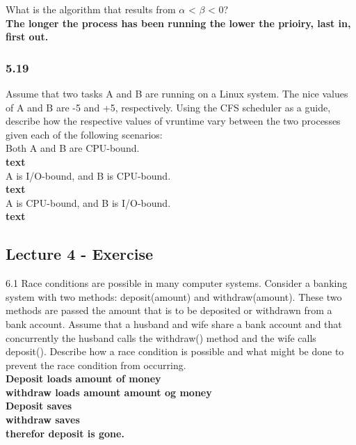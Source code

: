 \documentclass[a4paper,10pt,titlepage]{report}
\begin{document}
\hspace{10mm}What is the algorithm that results from $\alpha$ < $\beta$ < 0?\\

\setlength\parindent{20mm} \textbf{
	The longer the process has been running the lower the prioiry, last in, first out.
} \\

\subsubsection{5.19}
Assume that two tasks A and B are running on a Linux system. The nice values of A and B are -5 and +5, respectively. Using the CFS scheduler as a guide, describe how the respective values of vruntime vary between the two processes given each of the following scenarios:\\
\hspace{10mm} Both A and B are CPU-bound.\\
\hspace{20mm} \textbf{
	text
} \\

\hspace{10mm} A is I/O-bound, and B is CPU-bound.\\
\hspace{20mm} \textbf{
	text
} \\

\hspace{10mm} A is CPU-bound, and B is I/O-bound.\\
\hspace{20mm} \textbf{
	text
} \\
\subsection{Lecture 4 - Exercise}
6.1 Race conditions are possible in many computer systems. Consider a banking system with two methods: deposit(amount) and withdraw(amount). These two methods are passed the amount that is to be deposited or withdrawn from a bank account. Assume that a husband and wife share a bank account and that concurrently the husband calls the withdraw() method and the wife calls deposit(). Describe how a race condition is possible and what might be done to prevent the race condition from occurring.\\

\textbf{
Deposit loads  amount of money\\
withdraw loads amount amount og money\\
Deposit saves\\
withdraw saves\\
therefor deposit is gone.
}
\\
\end{document}

